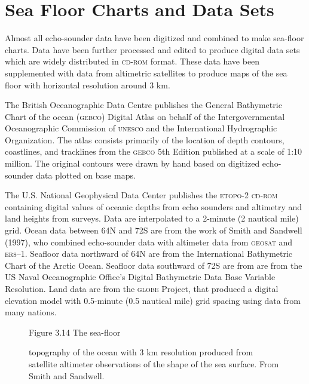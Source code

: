 \section{Sea Floor Charts and Data Sets}
Almost all echo-sounder data have been digitized
and combined to make sea-floor charts. Data have been further
processed and edited to produce digital data sets which are widely
distributed in \textsc{cd-rom} format. These data have been
supplemented with data from altimetric satellites to produce maps of
the sea floor with horizontal resolution around 3 km.

The British Oceanographic Data Centre publishes the General
Bathymetric Chart of the ocean (\textsc{gebco}) Digital Atlas on behalf of the Intergovernmental
Oceanographic Commission of \textsc{unesco} and the International
Hydrographic Organization. The atlas consists primarily of the location of depth
contours, coastlines, and tracklines from the \textsc{gebco} 5th
Edition published at a scale of 1:10 million. The original contours
were drawn by hand based on digitized echo-sounder data plotted on
base maps.

The U.S. National Geophysical Data Center publishes the \textsc{etopo-2 cd-rom} containing
digital values of oceanic depths from echo sounders and altimetry and
land heights from surveys. Data are interpolated to a 2-minute (2
nautical mile) grid. Ocean data between 64\degrees N and 72\degrees S
are from the work of Smith and Sandwell (1997), who combined
echo-sounder data with altimeter data from \textsc{geosat} and
\textsc{ers--1}. Seafloor data northward of 64\degrees N are from the
International Bathymetric Chart of the Arctic Ocean.  Seafloor data
southward of 72\degrees S are from are from the US Naval Oceanographic
Office's Digital Bathymetric Data Base Variable Resolution. Land data
are from the \textsc{globe} Project, that produced a digital elevation
model with 0.5-minute (0.5 nautical mile) grid spacing using data from
many nations.

\begin{figure}[t!]
\centering
\footnotesize
Figure 3.14 The sea-floor \rule{0pt}{3ex}topography of the ocean with
3 km resolution produced from satellite altimeter observations of the
shape of the sea surface. From Smith and Sandwell.

\label{fig:worlsbathym}
\vspace{-4ex}
\end{figure}

